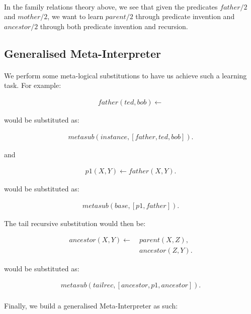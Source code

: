 \documentclass{article}
\theoremstyle{plain}
\theoremstyle{definition}
\begin{document}
\begin{multicols}{2}
\paragraph{} In the family relations theory above, we see that given the predicates $father/2$ and $mother/2$, we want to learn $parent/2$ through predicate invention and $ancestor/2$ through both predicate invention and recursion.

\subsection{Generalised Meta-Interpreter}

\paragraph{} We perform some meta-logical substitutions to have us achieve such a learning task. For example:

\begin{align*}
father(ted, bob) \leftarrow
\end{align*}

would be substituted as:

\begin{align*}
metasub(instance, [father, ted, bob]).
\end{align*}

and

\begin{align*}
p1(X, Y) \leftarrow father(X, Y).
\end{align*}

would be substituted as:

\begin{align*}
metasub(base, [p1, father]).
\end{align*}

The tail recursive substitution would then be:

\begin{align*}
ancestor(X, Y) \leftarrow\ &parent(X, Z),\\ &ancestor(Z, Y).
\end{align*}

would be substituted as:

\begin{align*}
metasub(tailrec, [ancestor, p1, ancestor]).
\end{align*}

\paragraph{} Finally, we build a generalised Meta-Interpreter as such:


\end{multicols}
\end{document}

